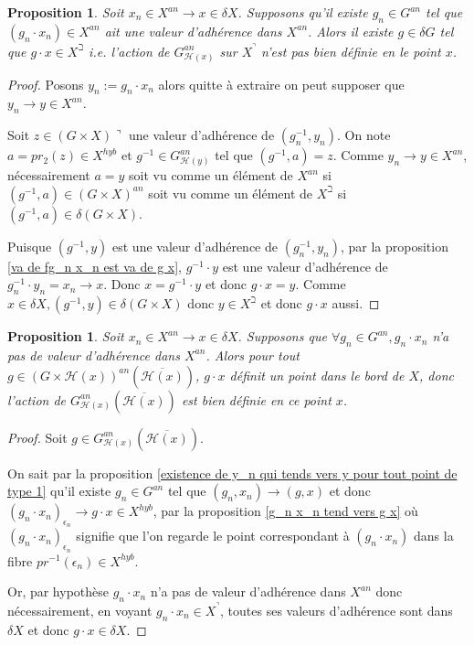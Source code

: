 \documentclass[11pt]{article}
\newtheorem{prop}[thm]{Proposition}
\begin{document}
\begin{prop}\label{si pas degenerence dans X/G alors action pas bien def}
Soit $x_n \in X^{an} \rightarrow x \in \delta X$. Supposons qu'il existe $g_n \in G^{an}$ tel que $(g_n\cdot x_n) \in X^{an}$ ait une valeur d'adhérence dans $X^{an}$. Alors il existe $g \in \delta G$ tel que $g\cdot x \in X^\beth$ i.e. l'action de $G^{an}_{\mathcal{H}(x)}$ sur $X^\urcorner$ n'est pas bien définie en le point $x$. 
\end{prop}

\begin{proof}
Posons $y_n := g_n \cdot x_n$ alors quitte à extraire on peut supposer que $y_n \rightarrow y \in X^{an}$. 

Soit $z \in (G \times X)\urcorner$ une valeur d'adhérence de $(g_n^{-1}, y_n)$. On note $a = pr_2(z) \in X^{hyb}$ et $g^{-1} \in G^{an}_{\mathcal{H}(y)}$ tel que $(g^{-1}, a) = z$. Comme $y_n \rightarrow y \in X^{an}$, nécessairement $a = y$ soit vu comme un élément de $X^{an}$ si $(g^{-1}, a) \in (G\times X)^{an}$ soit vu comme un élément de $X^\beth$ si $(g^{-1}, a) \in \delta (G\times X)$. 

Puisque $(g^{-1}, y)$ est une valeur d'adhérence de $(g_n^{-1}, y_n)$, par la proposition \ref{va de fg_n x_n est va de g x}, $g^{-1} \cdot y$ est une valeur d'adhérence de $g_n^{-1}\cdot y_n= x_n \rightarrow x$. Donc $x =g^{-1} \cdot y $ et donc $ g\cdot x =y$. Comme $x\in \delta X, (g^{-1},y) \in \delta (G\times X)$ donc $y \in X^\beth$ et donc $g\cdot x$ aussi. 
\end{proof}

\begin{prop}\label{bonne déf action}
Soit $x_n \in X^{an} \rightarrow x\in \delta X$. Supposons que $\forall g_n \in G^{an}, g_n\cdot x_n$ n'a pas de valeur d'adhérence dans $X^{an}$. Alors pour tout $g \in (G\times \mathcal{H}(x))^{an}(\overline{\mathcal{H}(x)})$, $g\cdot x$ définit un point dans le bord de $X$, donc l'action de $G^{an}_{\mathcal{H}(x)}(\overline{\mathcal{H}(x)})$ est bien définie en ce point $x$. 
\end{prop}

\begin{proof}
Soit $g \in G^{an}_{\mathcal{H}(x)}(\overline{\mathcal{H}(x)})$.

On sait par la proposition \ref{existence de y_n qui tends vers y pour tout point de type 1} qu'il existe $g_n \in G^{an}$ tel que $(g_n, x_n) \rightarrow (g,x)$ et donc $(g_n\cdot x_n)_{\epsilon_n} \rightarrow g\cdot x \in X^{hyb}$, par la proposition \ref{g_n x_n tend vers g x} où $(g_n\cdot x_n)_{\epsilon_n}$ signifie que l'on regarde le point correspondant à $(g_n\cdot x_n)$ dans la fibre $pr^{-1}(\epsilon_n) \in X^{hyb}$. 

Or, par hypothèse $g_n\cdot x_n$ n'a pas de valeur d'adhérence dans $X^{an}$ donc nécessairement, en voyant $g_n\cdot x_n \in X^\urcorner$, toutes ses valeurs d'adhérence sont dans $\delta X$ et donc $g\cdot x \in \delta X$.
\end{proof}
\end{document}
